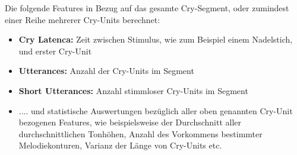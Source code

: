 Die folgende Features in Bezug auf das gesamte Cry-Segment, oder zumindest einer Reihe mehrerer Cry-Units berechnet:

\begin{itemize}
	\item \textbf{Cry Latenca: } Zeit zwischen Stimulus, wie zum Beispiel einem Nadelstich, und erster Cry-Unit
	\item \textbf{Utterances: } Anzahl der Cry-Units im Segment
	\item \textbf{Short Utterances: } Anzahl stimmloser Cry-Units im Segment
	\item .... und statistische Auswertungen bezüglich aller oben genannten Cry-Unit bezogenen Features, wie beispielsweise der Durchschnitt aller durchschnittlichen Tonhöhen, Anzahl des Vorkommens bestimmter Melodiekonturen, Varianz der Länge von Cry-Units etc.
\end{itemize}




